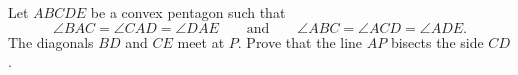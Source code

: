 Let $ABCDE$ be a convex pentagon such that
\[
\angle BAC = \angle CAD = \angle DAE \qquad \text{and} \qquad \angle ABC = \angle ACD = \angle ADE.
\]
The diagonals $BD$ and $CE$ meet at $P$. Prove that the line $AP$ bisects the side $CD$.
